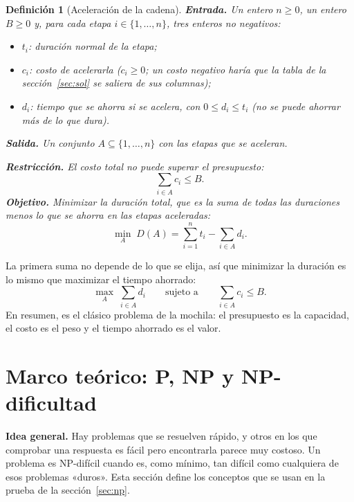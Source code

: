 \documentclass[11pt,a4paper]{article}
\theoremstyle{plano}
\newtheorem{definicion}{Definición}[section]
\begin{document}
\begin{definicion}[Aceleración de la cadena]
\textbf{Entrada.} Un entero $n\ge 0$, un entero $B\ge 0$ y, para cada etapa $i\in\{1,\dots,n\}$, tres enteros no negativos:
\begin{itemize}
  \item $t_i$: duración normal de la etapa;
  \item $c_i$: costo de acelerarla ($c_i\ge 0$; un costo negativo haría que la tabla de la sección~\ref{sec:sol} se saliera de sus columnas);
  \item $d_i$: tiempo que se ahorra si se acelera, con $0\le d_i\le t_i$ (no se puede ahorrar más de lo que dura).
\end{itemize}
\textbf{Salida.} Un conjunto $A\subseteq\{1,\dots,n\}$ con las etapas que se aceleran.

\textbf{Restricción.} El costo total no puede superar el presupuesto:
\begin{equation}
  \sum_{i\in A} c_i \le B.
\end{equation}
\textbf{Objetivo.} Minimizar la duración total, que es la suma de todas las duraciones menos lo que se ahorra en las etapas aceleradas:
\begin{equation}
  \min_{A}\; D(A)=\sum_{i=1}^{n} t_i-\sum_{i\in A} d_i.
\end{equation}
\end{definicion}
La primera suma no depende de lo que se elija, así que minimizar la duración es lo mismo que maximizar el tiempo ahorrado:
\begin{equation}
  \max_{A}\;\sum_{i\in A} d_i \qquad\text{sujeto a}\qquad \sum_{i\in A} c_i\le B.
\end{equation}
En resumen, es el clásico problema de la mochila: el presupuesto es la capacidad, el costo es el peso y el tiempo ahorrado es el valor.

\section{Marco teórico: P, NP y NP-dificultad}

\textbf{Idea general.} Hay problemas que se resuelven rápido, y otros en los que comprobar una respuesta es fácil pero encontrarla parece muy costoso. Un problema es NP-difícil cuando es, como mínimo, tan difícil como cualquiera de esos problemas «duros». Esta sección define los conceptos que se usan en la prueba de la sección~\ref{sec:np}.
\end{document}
